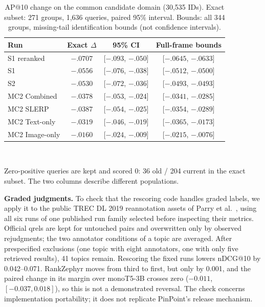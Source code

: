 \documentclass[conference]{IEEEtran}
\begin{document}
\begin{table}[!t]
\centering
\caption{AP@10 change on the common candidate domain (30,535 IDs). Exact subset: 271 groups, 1,636 queries, paired 95\% interval. Bounds: all 344 groups, missing-tail identification bounds (not confidence intervals).}
\label{tab:common}
\setlength{\tabcolsep}{4pt}
\footnotesize
\begin{tabular}{@{}lccc@{}}
\toprule
Run & Exact $\Delta$ & 95\% CI & Full-frame bounds\\
\midrule
S1 reranked & $-.0707$ & [$-.093$, $-.050$] & [$-.0645$, $-.0633$]\\
S1 & $-.0556$ & [$-.076$, $-.038$] & [$-.0512$, $-.0500$]\\
S2 & $-.0530$ & [$-.072$, $-.036$] & [$-.0493$, $-.0493$]\\
MC2 Combined & $-.0378$ & [$-.053$, $-.024$] & [$-.0341$, $-.0285$]\\
MC2 SLERP & $-.0387$ & [$-.054$, $-.025$] & [$-.0354$, $-.0289$]\\
MC2 Text-only & $-.0319$ & [$-.046$, $-.019$] & [$-.0365$, $-.0173$]\\
MC2 Image-only & $-.0160$ & [$-.024$, $-.009$] & [$-.0215$, $-.0076$]\\
\bottomrule
\end{tabular}
\\[2pt]\raggedright\scriptsize Zero-positive queries are kept and scored 0: 36 old / 204 current in the exact subset. The two columns describe different populations.
\end{table}

\textbf{Graded judgments.} To check that the rescoring code handles graded labels, we apply it to the public TREC DL 2019 reannotation assets of Parry et al.~\cite{parry2025}, using all six runs of one published run family selected before inspecting their metrics. Official qrels are kept for untouched pairs and overwritten only by observed rejudgments; the two annotator conditions of a topic are averaged. After prespecified exclusions (one topic with eight annotators, one with only five retrieved results), 41 topics remain. Rescoring the fixed runs lowers nDCG@10 by 0.042--0.071. RankZephyr moves from third to first, but only by 0.001, and the paired change in its margin over monoT5-3B crosses zero ($-0.011$, $[-0.037, 0.018]$), so this is not a demonstrated reversal. The check concerns implementation portability; it does not replicate PinPoint's release mechanism.

\end{document}
